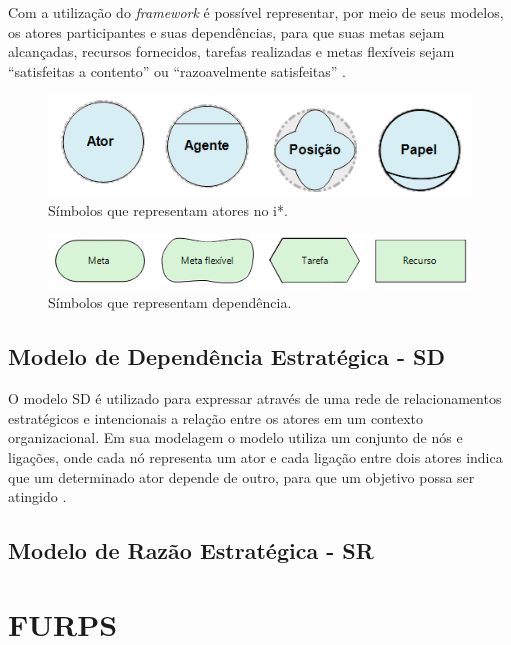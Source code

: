 Com a utilização do \textit{framework} é possível representar, por meio de seus modelos, os atores participantes e suas dependências, para que suas metas sejam alcançadas, recursos fornecidos, tarefas realizadas e metas flexíveis sejam “satisfeitas a contento” ou “razoavelmente satisfeitas” \cite{istarwiki20}.
 
 \begin{figure}[h!]
 	\centering
 	\includegraphics[keepaspectratio=true,scale=1.0]{figuras/papeisIstar.PNG}
 	\caption{Símbolos que representam atores no i*.}
 	\label{atores}
 \end{figure}
 
\begin{figure}[h]
	\centering
	\includegraphics[keepaspectratio=true,scale=1.0]{figuras/TiposDeContribuicao.png}
	\caption{Símbolos que representam dependência.}
	\label{dependenciaIstar}
\end{figure} 
 
\subsection{Modelo de Dependência Estratégica - SD}
\label{subsec:SD}

O modelo SD é utilizado para expressar através de uma rede de relacionamentos estratégicos e intencionais a relação entre os atores em um contexto organizacional. Em sua modelagem o modelo utiliza um conjunto de nós e ligações, onde cada nó representa um ator e cada ligação entre dois atores indica que um determinado ator depende de outro, para que um objetivo possa ser atingido \cite{istarwiki20}.


\subsection{Modelo de Razão Estratégica - SR}
\label{subsec:SR}

\section{FURPS}
\label{sec:furps}

